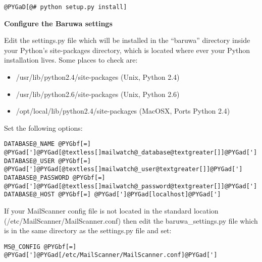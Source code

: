 \documentclass[a4paper,10pt,english]{manual}
\begin{document}
\begin{Verbatim}[commandchars=@\[\]]
@PYGaD[@# python setup.py install]
\end{Verbatim}

\textbf{Configure the Baruwa settings}

Edit the settings.py file which will be installed in the ``baruwa''
directory inside your Python's site-packages directory, which is
located where ever your Python installation lives. Some places
to check are:
\begin{itemize}
\item {} 
/usr/lib/python2.4/site-packages (Unix, Python 2.4)

\item {} 
/usr/lib/python2.6/site-packages (Unix, Python 2.6)

\item {} 
/opt/local/lib/python2.4/site-packages (MacOSX, Ports Python 2.4)

\end{itemize}

Set the following options:

\begin{Verbatim}[commandchars=@\[\]]
DATABASE@_NAME @PYGbf[=] @PYGad[']@PYGad[@textless[]mailwatch@_database@textgreater[]]@PYGad[']
DATABASE@_USER @PYGbf[=] @PYGad[']@PYGad[@textless[]mailwatch@_user@textgreater[]]@PYGad[']
DATABASE@_PASSWORD @PYGbf[=] @PYGad[']@PYGad[@textless[]mailwatch@_password@textgreater[]]@PYGad[']
DATABASE@_HOST @PYGbf[=] @PYGad[']@PYGad[localhost]@PYGad[']
\end{Verbatim}

If your MailScanner config file is not located in the standard
location (/etc/MailScanner/MailScanner.conf) then edit the
baruwa\_settings.py file which is in the same directory as the
settings.py file and set:

\begin{Verbatim}[commandchars=@\[\]]
MS@_CONFIG @PYGbf[=] @PYGad[']@PYGad[/etc/MailScanner/MailScanner.conf]@PYGad[']
\end{Verbatim}
\end{document}
